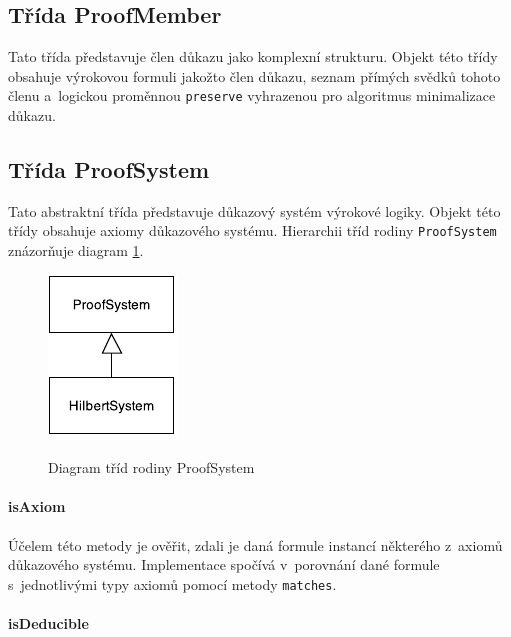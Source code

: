\documentclass[thesis=B,czech,hidelinks]{thesis}[2012/06/26]
\begin{document}
\subsection{Třída ProofMember}

Tato třída představuje člen důkazu jako komplexní strukturu. Objekt této třídy obsahuje výrokovou formuli jakožto člen důkazu, seznam přímých svědků tohoto členu a~logickou proměnnou \texttt{preserve} vyhrazenou pro algoritmus minimalizace důkazu.

\subsection{Třída ProofSystem}

Tato abstraktní třída představuje důkazový systém výrokové logiky. Objekt této třídy obsahuje axiomy důkazového systému. Hierarchii tříd rodiny \texttt{ProofSystem} znázorňuje diagram \ref{fig:proof_system}.

\begin{figure}
\centering
\caption{Diagram tříd rodiny ProofSystem}
\includegraphics{diagrams/proof_system}
\label{fig:proof_system}
\end{figure}

\paragraph{isAxiom}

Účelem této metody je ověřit, zdali je daná formule instancí některého z~axiomů důkazového systému. Implementace spočívá v~porovnání dané formule s~jednotlivými typy axiomů pomocí metody \texttt{matches}.

\begin{algorithm}
{
	{
		\;
	}
}
\;
\end{algorithm}

\paragraph{isDeducible}
\end{document}
